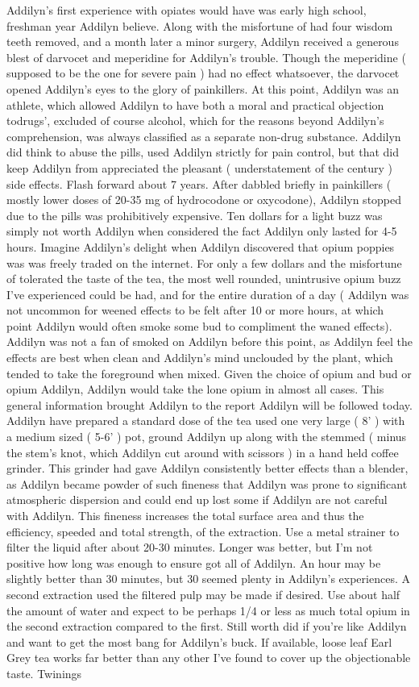 \documentclass[12pt]{book}
\begin{document}
Addilyn's first experience with opiates would have was early high school, freshman year Addilyn believe. Along with the misfortune of had four wisdom teeth removed, and a month later a minor surgery, Addilyn received a generous blest of darvocet and meperidine for Addilyn's trouble. Though the meperidine ( supposed to be the one for severe pain ) had no effect whatsoever, the darvocet opened Addilyn's eyes to the glory of painkillers. At this point, Addilyn was an athlete, which allowed Addilyn to have both a moral and practical objection todrugs', excluded of course alcohol, which for the reasons beyond Addilyn's comprehension, was always classified as a separate non-drug substance. Addilyn did think to abuse the pills, used Addilyn strictly for pain control, but that did keep Addilyn from appreciated the pleasant ( understatement of the century ) side effects. Flash forward about 7 years. After dabbled briefly in painkillers ( mostly lower doses of 20-35 mg of hydrocodone or oxycodone), Addilyn stopped due to the pills was prohibitively expensive. Ten dollars for a light buzz was simply not worth Addilyn when considered the fact Addilyn only lasted for 4-5 hours. Imagine Addilyn's delight when Addilyn discovered that opium poppies was was freely traded on the internet. For only a few dollars and the misfortune of tolerated the taste of the tea, the most well rounded, unintrusive opium buzz I've experienced could be had, and for the entire duration of a day ( Addilyn was not uncommon for weened effects to be felt after 10 or more hours, at which point Addilyn would often smoke some bud to compliment the waned effects). Addilyn was not a fan of smoked on Addilyn before this point, as Addilyn feel the effects are best when clean and Addilyn's mind unclouded by the plant, which tended to take the foreground when mixed. Given the choice of opium and bud or opium Addilyn, Addilyn would take the lone opium in almost all cases. This general information brought Addilyn to the report Addilyn will be followed today. Addilyn have prepared a standard dose of the tea used one very large ( 8' ) with a medium sized ( 5-6' ) pot, ground Addilyn up along with the stemmed ( minus the stem's knot, which Addilyn cut around with scissors ) in a hand held coffee grinder. This grinder had gave Addilyn consistently better effects than a blender, as Addilyn became powder of such fineness that Addilyn was prone to significant atmospheric dispersion and could end up lost some if Addilyn are not careful with Addilyn. This fineness increases the total surface area and thus the efficiency, speeded and total strength, of the extraction. Use a metal strainer to filter the liquid after about 20-30 minutes. Longer was better, but I'm not positive how long was enough to ensure got all of Addilyn. An hour may be slightly better than 30 minutes, but 30 seemed plenty in Addilyn's experiences. A second extraction used the filtered pulp may be made if desired. Use about half the amount of water and expect to be perhaps 1/4 or less as much total opium in the second extraction compared to the first. Still worth did if you're like Addilyn and want to get the most bang for Addilyn's buck. If available, loose leaf Earl Grey tea works far better than any other I've found to cover up the objectionable taste. Twinings 
\end{document}
